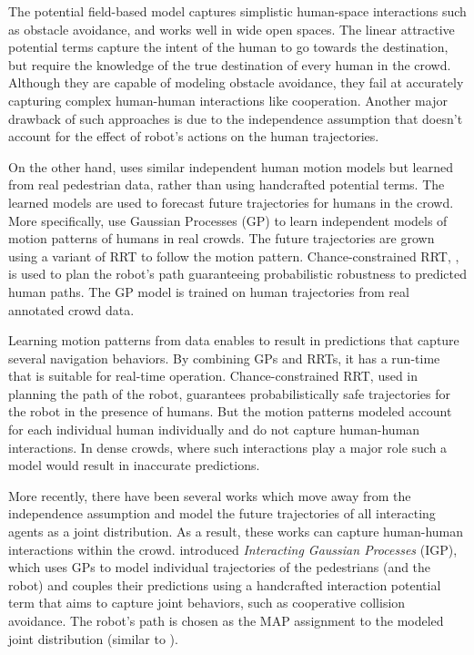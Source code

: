 The potential field-based model captures simplistic human-space interactions such as obstacle avoidance, and works well in wide open spaces. The linear attractive potential terms capture the intent of the human to go towards the destination, but require the knowledge of the true destination of every human in the crowd. Although they are capable of modeling obstacle avoidance, they fail at accurately capturing complex human-human interactions like cooperation. Another major drawback of such approaches is due to the independence assumption that doesn't account for the effect of robot's actions on the human trajectories.

On the other hand, \cite{aoude2013probabilistically} uses similar independent human motion models but learned from real pedestrian data, rather than using handcrafted potential terms. The learned models are used to forecast future trajectories for humans in the crowd. More specifically, \cite{aoude2013probabilistically} use Gaussian Processes (GP) to learn independent models of motion patterns of humans in real crowds. The future trajectories are grown using a variant of RRT to follow the motion pattern. Chance-constrained RRT, \cite{luders10}, is used to plan the robot's path guaranteeing probabilistic robustness to predicted human paths. The GP model is trained on human trajectories from real annotated crowd data.

Learning motion patterns from data enables \cite{aoude2013probabilistically} to result in predictions that capture several navigation behaviors. By combining GPs and RRTs, it has a run-time that is suitable for real-time operation. Chance-constrained RRT, used in planning the path of the robot, guarantees probabilistically safe trajectories for the robot in the presence of humans. But the motion patterns modeled account for each individual human individually and do not capture human-human interactions. In dense crowds, where such interactions play a major role such a model would result in inaccurate predictions.

More recently, there have been several works which move away from the independence assumption and model the future trajectories of all interacting agents as a joint distribution. As a result, these works can capture human-human interactions within the crowd. \cite{trautman2015robot} introduced \textit{Interacting Gaussian Processes} (IGP), which uses GPs to model individual trajectories of the pedestrians (and the robot) and couples their predictions using a handcrafted interaction potential term that aims to capture joint behaviors, such as cooperative collision avoidance. The robot's path is chosen as the MAP assignment to the modeled joint distribution (similar to ).

